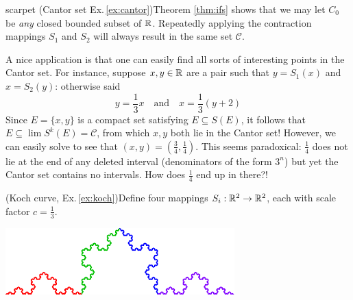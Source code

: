 \begin{examples}{}{scarpet}
	\exstart (Cantor set Ex.\,\ref{ex:cantor})\lstsp Theorem \ref{thm:ifs} shows that we may let $C_0$ be \emph{any} closed bounded subset of $\mathbb{R}$. Repeatedly applying the contraction mappings $S_1$ and $S_2$ will always result in the same set $\mathcal C$.\vspace{-10pt}
	
	\begin{enumerate}\setcounter{enumi}{1}
	  \item[]A nice application is that one can easily find all sorts of interesting points in the Cantor set. For instance, suppose $x,y\in\mathbb{R}$ are a pair such that $y=S_1(x)$ and $x=S_2(y)$: otherwise said
		\[
			y=\frac 13 x\quad\text{and}\quad x=\frac 13(y+2)
		\]
		Since $E=\{x,y\}$ is a compact set satisfying $E\subseteq S(E)$, it follows that $E\subseteq\lim S^k(E)=\mathcal C$, from which $x,y$ both lie in the Cantor set! However, we can easily solve to see that $(x,y)=(\frac 34,\frac 14)$. This seems paradoxical: $\frac 14$ does not lie at the end of any deleted interval (denominators of the form $3^n$) but yet the Cantor set contains no intervals. How does $\frac 14$ end up in there?!
	
	\begin{minipage}[t]{0.65\linewidth}\vspace{0pt}
		\item (Koch curve, Ex.\,\ref{ex:koch})\lstsp Define four mappings $S_i:\mathbb{R}^2\to\mathbb{R}^2$, each with scale factor $c=\frac 13$.
	\end{minipage}
	\hfill
	\begin{minipage}[t]{0.34\linewidth}\vspace{0pt}
		\flushright \href{http://www.math.uci.edu/~ndonalds/math161/koch-anim2.html}{\includegraphics[scale=0.96]{koch3}}
	\end{minipage}\par
	\vspace{-15pt}
	

\end{enumerate}
\end{examples}
